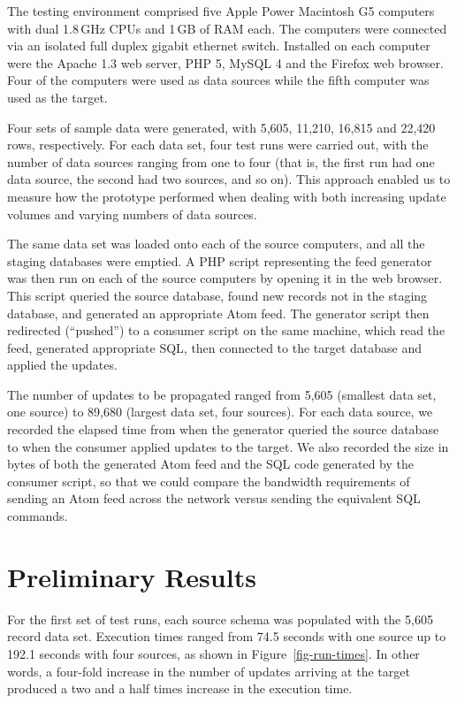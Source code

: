\documentclass{CRPITStyle}
\begin{document}
The testing environment comprised five Apple Power Macintosh G5
computers with dual 1.8\,GHz CPUs and 1\,GB of RAM each. The computers
were connected via an isolated full duplex gigabit ethernet switch.
Installed on each computer were the Apache 1.3 web server, PHP 5, MySQL
4 and the Firefox web browser. Four of the computers were used as data
sources while the fifth computer was used as the target.

Four sets of sample data were generated, with 5,605, 11,210, 16,815 and
22,420 rows, respectively. For each data set, four test runs were
carried out, with the number of data sources ranging from one to four
(that is, the first run had one data source, the second had two sources,
and so on). This approach enabled us to measure how the prototype
performed when dealing with both increasing update volumes and varying
numbers of data sources.

The same data set was loaded onto each of the source computers, and all
the staging databases were emptied. A PHP script representing the feed
generator was then run on each of the source computers by opening it in
the web browser. This script queried the source database, found new
records not in the staging database, and generated an appropriate Atom
feed. The generator script then redirected (``pushed'') to a consumer
script on the same machine, which read the feed, generated appropriate
SQL, then connected to the target database and applied the updates.

The number of updates to be propagated ranged from 5,605 (smallest data
set, one source) to 89,680 (largest data set, four sources). For each
data source, we recorded the elapsed time from when the generator
queried the source database to when the consumer applied updates to the
target. We also recorded the size in bytes of both the generated Atom
feed and the SQL code generated by the consumer script, so that we could
compare the bandwidth requirements of sending an Atom feed across the
network versus sending the equivalent SQL commands.


\section{Preliminary Results}
\label{sec-results}

For the first set of test runs, each source schema was populated with
the 5,605 record data set. Execution times ranged from 74.5 seconds with
one source up to 192.1 seconds with four sources, as shown in
Figure~\ref{fig-run-times}. In other words, a four-fold increase in the
number of updates arriving at the target produced a two and a half times
increase in the execution time.
\end{document}
